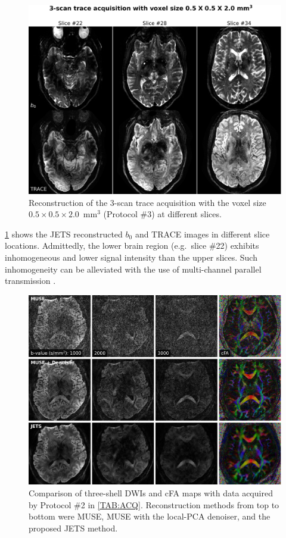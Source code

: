\documentclass[preprint,12pt,authoryear,review]{elsarticle}
\begin{document}
    \begin{figure}
        \centering
        \includegraphics[width=\textwidth]{../figures/fig8.png}
        \caption{Reconstruction of the 3-scan trace acquisition with
        the voxel size $0.5\times0.5\times2.0$~mm$^3$ (Protocol \#3)
        at different slices.}
        \label{FIG:0.5mm_slice}
    \end{figure}

    \cref{FIG:0.5mm_slice} shows the JETS reconstructed $b_0$
    and TRACE images in different slice locations.
    Admittedly, the lower brain region (e.g.~slice \#22)
    exhibits inhomogeneous and lower signal intensity
    than the upper slices.
    Such inhomogeneity can be alleviated with
    the use of multi-channel parallel transmission
    \citep{katscher_2003_ptx,grissom_2010_ptx}.



    \begin{figure}
        \centering
        \includegraphics[width=\textwidth]{../figures/fig9.png}
        \caption{Comparison of three-shell DWIs and
        cFA maps with data acquired by Protocol \#2 in \cref{TAB:ACQ}.
        Reconstruction methods from top to bottom were
        MUSE, MUSE with the local-PCA denoiser,
        and the proposed JETS method.}
        \label{FIG:1.0mm_dti}
    \end{figure}
\end{document}
